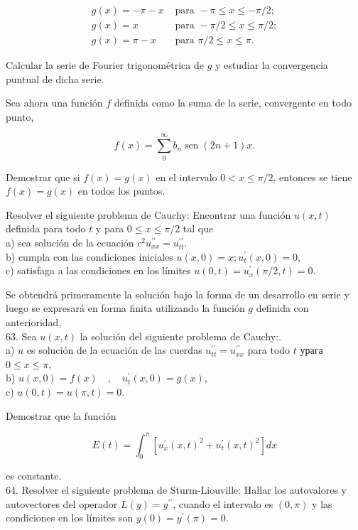 \documentclass[10pt]{article}
\theoremstyle{plain}
\theoremstyle{definition}
\theoremstyle{remark}
\begin{document}
$$
\begin{array}{ll}
g(x)=-\pi-x & \text { para }-\pi \leqslant x \leqslant-\pi / 2 ; \\
g(x)=x & \text { para }-\pi / 2 \leqslant x \leqslant \pi / 2 ; \\
g(x)=\pi-x & \text { para } \pi / 2 \leqslant x \leqslant \pi .
\end{array}
$$

Calcular la serie de Fourier trigonométrica de $g$ y estudiar la convergencia puntual de dicha serie.

Sea ahora una función $f$ definida como la suma de la serie, convergente en todo punto,

$$
f(x)=\sum_{0}^{\infty} b_{n} \operatorname{sen}(2 n+1) x .
$$

Demostrar que si $f(x)=g(x)$ en el intervalo $0<x \leqslant \pi / 2$, entonces se tiene $f(x)=g(x)$ en todos los puntos.

Resolver el siguiente problema de Cauchy: Encontrar una función $u(x, t)$ definida para todo $t$ y para $0 \leqslant x \leqslant \pi / 2$ tal que\\
a) sea solución de la ecuación $c^{2} u_{x x}^{\prime \prime}=u_{t t}^{\prime \prime}$.\\
b) cumpla con las condiciones iniciales $u(x, 0)=x ; u_{t}^{\prime}(x, 0)=0$,\\
c) satisfaga a las condiciones en los límites $u(0, t)=u_{x}^{\prime}(\pi / 2, t)=0$.

Se obtendrá primeramente la solución bajo la forma de un desarrollo en serie y luego se expresará en forma finita utilizando la función $g$ definida con anterioridad,\\
63. Sea $u(x, t)$ la solución del siguiente problema de Cauchy:.\\
a) $u$ es solución de la ecuación de las cuerdas $u_{t t}^{\prime \prime}=u_{x x}^{\prime \prime}$ para todo $t$ урага $0 \leqslant x \leqslant \pi$,\\
b) $u(x, 0)=f(x) \quad, \quad u_{t}^{\prime}(x, 0)=g(x)$,\\
c) $u(0, t)=u(\pi, t)=0$.

Demostrar que la función

$$
E(t)=\int_{0}^{\pi}\left[u_{x}^{\prime}(x, t)^{2}+u_{t}^{\prime}(x, t)^{2}\right] d x
$$

es constante.\\
64. Resolver el siguiente problema de Sturm-Liouville: Hallar los autovalores y autovectores del operador $L(y)=y^{\prime \prime}$, cuando el intervalo es $(0, \pi)$ y las condiciones en los límites son $y(0)=y^{\prime}(\pi)=0$.
\end{document}
